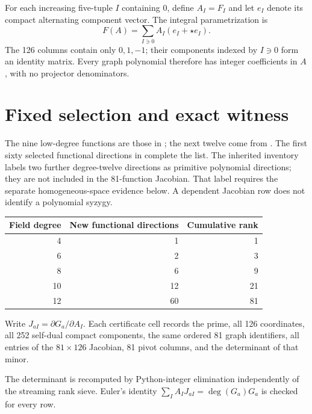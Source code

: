 \documentclass[11pt]{article}
\begin{document}
For each increasing five-tuple $I$ containing 0, define
$A_I=F_I$ and let $e_I$ denote its compact alternating component vector.
The integral parametrization is
\[
 F(A)=\sum_{I\ni0} A_I(e_I+\star e_I).
\]
The 126 columns contain only $0,1,-1$; their components indexed by $I\ni0$
form an identity matrix. Every graph polynomial therefore has integer
coefficients in $A$, with no projector denominators.

\section{Fixed selection and exact witness}
The nine low-degree functions are those in
; the next twelve come from
. The first sixty selected functional
directions in  complete the list.
The inherited inventory labels two further degree-twelve directions as
primitive polynomial directions; they are not included in the 81-function
Jacobian. That label requires the separate homogeneous-space evidence below. A dependent Jacobian row does not identify a polynomial syzygy.

\begin{center}
\begin{tabular}{rrr}
\toprule
Field degree & New functional directions & Cumulative rank\\
\midrule
4 & 1 & 1\\
6 & 2 & 3\\
8 & 6 & 9\\
10 & 12 & 21\\
12 & 60 & 81\\
\bottomrule
\end{tabular}
\end{center}

Write $J_{aI}=\partial G_a/\partial A_I$. Each certificate cell records
the prime, all 126 coordinates, all 252 self-dual compact components,
the same ordered 81 graph identifiers, all entries of the $81\times126$
Jacobian, 81 pivot columns, and the determinant of that minor.

The determinant is recomputed by Python-integer elimination independently
of the streaming rank sieve. Euler's identity
$\sum_I A_I J_{aI}=\deg(G_a)G_a$ is checked for every row.
\end{document}
